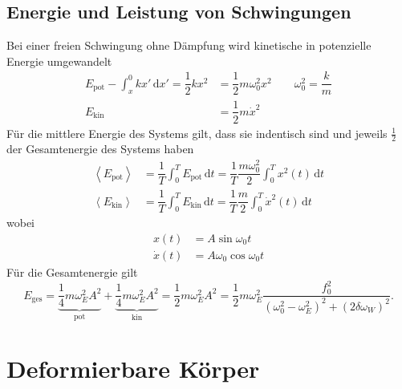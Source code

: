 \documentclass[a4paper,12pt]{article}
\newcommand{\td}{\,\text{d}}
\begin{document}
\subsection{Energie und Leistung von Schwingungen}
Bei einer freien Schwingung ohne Dämpfung wird kinetische in potenzielle Energie umgewandelt
\begin{align*}
        E_{\text{pot}}-\int_{x}^{0}kx'\td x'=\dfrac{1}{2}kx^2&=\dfrac{1}{2}m\omega _0^2x^2\qquad \omega _0^2=\dfrac{k}{m}\\
        E_{\text{kin}}&=\dfrac{1}{2}m\dot{x}^2
\end{align*}
Für die mittlere Energie des Systems gilt, dass sie indentisch sind und jeweils $\tfrac{1}{2}$ der Gesamtenergie des Systems haben
\begin{align*}
        \left\langle E_{\text{pot}}\right\rangle &=\dfrac{1}{T}\int_{0}^{T}E_{\text{pot}}\td t=\dfrac{1}{T}\dfrac{m\omega _0^2}{2}\int_{0}^{T}x^2\left(t\right)\td t\\
        \left\langle E_{\text{kin}}\right\rangle &=\dfrac{1}{T}\int_{0}^{T}E_{\text{kin}}\td t=\dfrac{1}{T}\dfrac{m}{2}\int_{0}^{T}\dot{x}^2\left(t\right)\td t
\end{align*}
wobei
\begin{align*}
        x\left(t\right)&=A\sin \omega _0t\\
        \dot{x}\left(t\right)&=A\omega _0\cos \omega _0t
\end{align*}
Für die Gesamtenergie gilt
\[ 
        E_{\text{ges}}=\underbrace{\dfrac{1}{4}m\omega _E^2A^2}_{\text{pot}}+\underbrace{\dfrac{1}{4}m\omega _E^2A^2}_{\text{kin}}=\dfrac{1}{2}m\omega _E^2A^2=\dfrac{1}{2}m\omega _E^2\dfrac{f_0^2}{\left(\omega _0^2-\omega _E^2\right)^2+\left(2\delta \omega _W\right)^2}
.\] 

\section{Deformierbare Körper}
\end{document}
